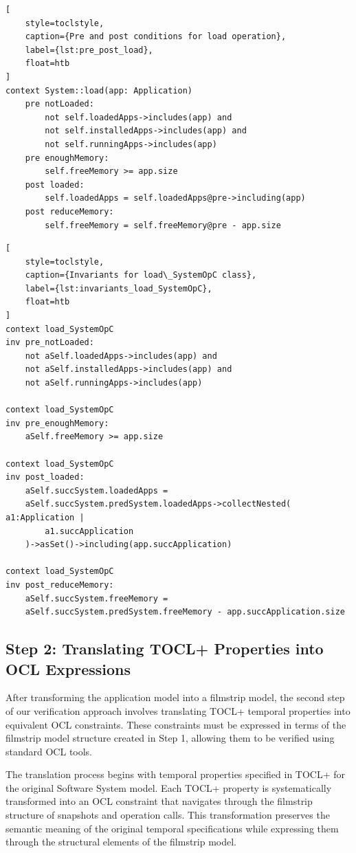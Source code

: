\begin{lstlisting}[
    style=toclstyle, 
    caption={Pre and post conditions for load operation}, 
    label={lst:pre_post_load},
    float=htb
]
context System::load(app: Application)
    pre notLoaded: 
        not self.loadedApps->includes(app) and
        not self.installedApps->includes(app) and
        not self.runningApps->includes(app)
    pre enoughMemory: 
        self.freeMemory >= app.size
    post loaded: 
        self.loadedApps = self.loadedApps@pre->including(app)
    post reduceMemory: 
        self.freeMemory = self.freeMemory@pre - app.size
\end{lstlisting}

\begin{lstlisting}[
    style=toclstyle, 
    caption={Invariants for load\_SystemOpC class}, 
    label={lst:invariants_load_SystemOpC},
    float=htb
]
context load_SystemOpC 
inv pre_notLoaded:
    not aSelf.loadedApps->includes(app) and 
    not aSelf.installedApps->includes(app) and 
    not aSelf.runningApps->includes(app)

context load_SystemOpC 
inv pre_enoughMemory:
    aSelf.freeMemory >= app.size

context load_SystemOpC 
inv post_loaded:
    aSelf.succSystem.loadedApps = 
    aSelf.succSystem.predSystem.loadedApps->collectNested( a1:Application | 
        a1.succApplication 
    )->asSet()->including(app.succApplication)

context load_SystemOpC 
inv post_reduceMemory:
    aSelf.succSystem.freeMemory = 
    aSelf.succSystem.predSystem.freeMemory - app.succApplication.size
\end{lstlisting}


\subsection{Step 2: Translating TOCL+ Properties into OCL Expressions}

\hspace{1cm} After transforming the application model into a filmstrip model, the 
second step of our verification approach involves translating TOCL+ temporal 
properties into equivalent OCL constraints. These constraints must be expressed in 
terms of the filmstrip model structure created in Step 1, allowing them to be 
verified using standard OCL tools.

The translation process begins with temporal properties specified in TOCL+ for the 
original Software System model. Each TOCL+ property is systematically transformed 
into an OCL constraint that navigates through the filmstrip structure of snapshots 
and operation calls. This transformation preserves the semantic meaning of the 
original temporal specifications while expressing them through the structural 
elements of the filmstrip model.

